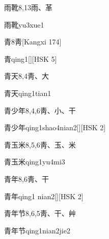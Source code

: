 \begin{Entry}{雨靴}{8,13}{⾬、⾰}
  \begin{Phonetics}{雨靴}{yu3xue1}
  \end{Phonetics}
\end{Entry}

\begin{Entry}{青}{8}{⾭}[Kangxi 174]
  \begin{Phonetics}{青}{qing1}[][HSK 5]
  \end{Phonetics}
\end{Entry}

\begin{Entry}{青天}{8,4}{⾭、⼤}
  \begin{Phonetics}{青天}{qing1tian1}
  \end{Phonetics}
\end{Entry}

\begin{Entry}{青少年}{8,4,6}{⾭、⼩、⼲}
  \begin{Phonetics}{青少年}{qing1shao4nian2}[][HSK 2]
  \end{Phonetics}
\end{Entry}

\begin{Entry}{青玉米}{8,5,6}{⾭、⽟、⽶}
  \begin{Phonetics}{青玉米}{qing1yu4mi3}
  \end{Phonetics}
\end{Entry}

\begin{Entry}{青年}{8,6}{⾭、⼲}
  \begin{Phonetics}{青年}{qing1 nian2}[][HSK 2]
  \end{Phonetics}
\end{Entry}

\begin{Entry}{青年节}{8,6,5}{⾭、⼲、⾋}
  \begin{Phonetics}{青年节}{qing1nian2jie2}
  \end{Phonetics}
\end{Entry}


